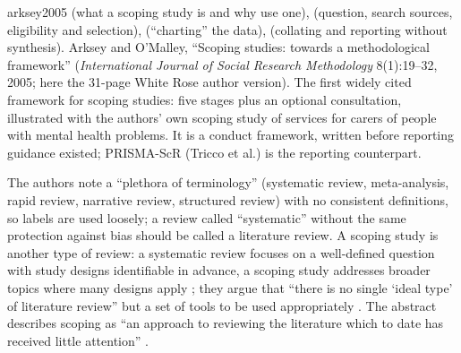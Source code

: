 \begin{papercard}{arksey2005}
  (what a scoping study is and why use one),  (question, search sources, eligibility and selection),  (``charting'' the data),  (collating and reporting without synthesis). Arksey and O'Malley, ``Scoping studies: towards a methodological framework'' (\emph{International Journal of Social Research Methodology} 8(1):19--32, 2005; here the 31-page White Rose author version). The first widely cited framework for scoping studies: five stages plus an optional consultation, illustrated with the authors' own scoping study of services for carers of people with mental health problems. It is a conduct framework, written before reporting guidance existed; PRISMA-ScR (Tricco et al.) is the reporting counterpart.

 The authors note a ``plethora of terminology'' (systematic review, meta-analysis, rapid review, narrative review, structured review) with no consistent definitions, so labels are used loosely; a review called ``systematic'' without the same protection against bias should be called a literature review. A scoping study is another type of review: a systematic review focuses on a well-defined question with study designs identifiable in advance, a scoping study addresses broader topics where many designs apply ; they argue that ``there is no single `ideal type' of literature review'' but a set of tools to be used appropriately . The abstract describes scoping as ``an approach to reviewing the literature which to date has received little attention'' .


\end{papercard}
